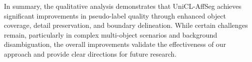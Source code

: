 In summary, the qualitative analysis demonstrates that UniCL-AffSeg achieves significant improvements in pseudo-label quality through enhanced object coverage, detail preservation, and boundary delineation. While certain challenges remain, particularly in complex multi-object scenarios and background disambiguation, the overall improvements validate the effectiveness of our approach and provide clear directions for future research.





